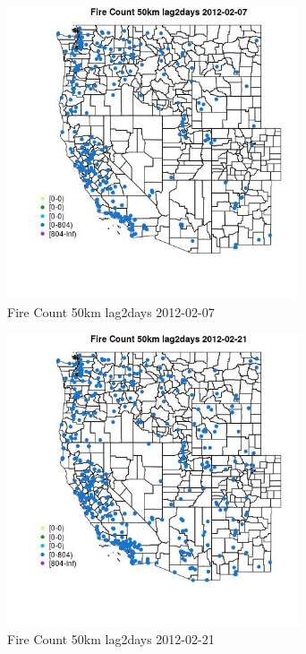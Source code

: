 \begin{figure} 
\centering  
\includegraphics[width=0.77\textwidth]{Code_Outputs/Report_ML_input_PM25_Step4_part_f_de_duplicated_aveswNAs_MapObsFire_Count_50km_lag2days2012-02-07.jpg} 
\caption{\label{fig:Report_ML_input_PM25_Step4_part_f_de_duplicated_aveswNAsMapObsFire_Count_50km_lag2days2012-02-07}Fire Count 50km lag2days 2012-02-07} 
\end{figure} 
 

\begin{figure} 
\centering  
\includegraphics[width=0.77\textwidth]{Code_Outputs/Report_ML_input_PM25_Step4_part_f_de_duplicated_aveswNAs_MapObsFire_Count_50km_lag2days2012-02-21.jpg} 
\caption{\label{fig:Report_ML_input_PM25_Step4_part_f_de_duplicated_aveswNAsMapObsFire_Count_50km_lag2days2012-02-21}Fire Count 50km lag2days 2012-02-21} 
\end{figure} 
 

